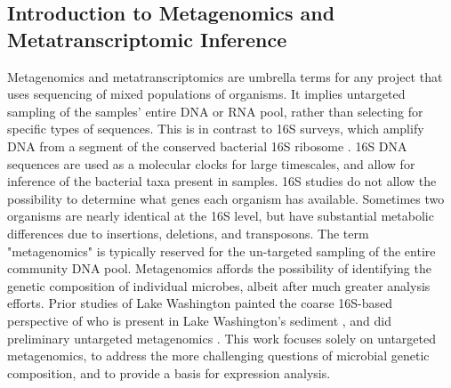 \subsection{Introduction to Metagenomics and Metatranscriptomic Inference}
Metagenomics and metatranscriptomics are umbrella terms for any project that uses sequencing of mixed populations of organisms.
It implies untargeted sampling of the samples' entire DNA or RNA pool, rather than selecting for specific types of sequences.
This is in contrast to 16S surveys, which amplify DNA from a segment of the conserved bacterial 16S ribosome \cite{kunin2008}.
16S DNA sequences are used as a molecular clocks for large timescales, and allow for inference of the bacterial taxa present in samples.
16S studies do not allow the possibility to determine what genes each organism has available.
Sometimes two organisms are nearly identical at the 16S level, but have substantial metabolic differences due to insertions, deletions, and transposons.  %
The term "metagenomics" is typically reserved for the un-targeted sampling of the entire community DNA pool.
Metagenomics affords the possibility of identifying the genetic composition of individual microbes, albeit after much greater analysis efforts.
Prior studies of Lake Washington painted the coarse 16S-based perspective of who is present in Lake Washington's sediment \cite{beck2013LW, hernandez2015LW, oshkin2015LW}, and did preliminary untargeted metagenomics \cite{beck2013LW, oshkin2015LW}.
This work focuses solely on untargeted metagenomics, to address the more challenging questions of microbial genetic composition, and to provide a basis for expression analysis.


